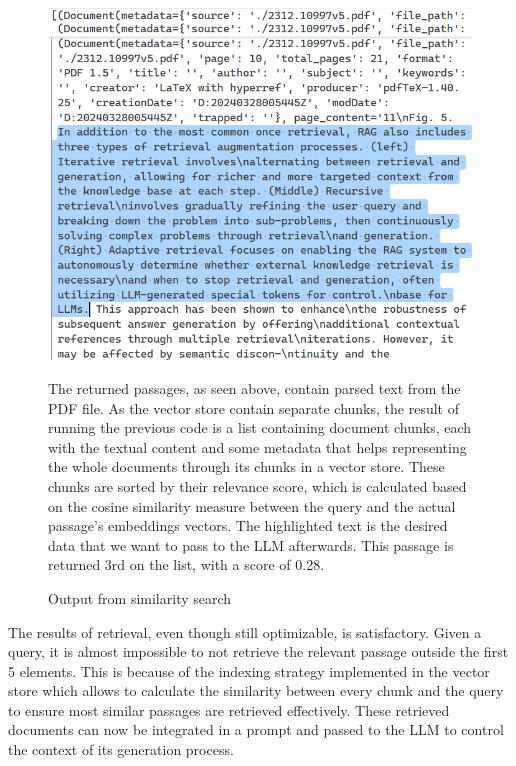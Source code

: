 \begin{figure}[H]
    \centering
    \includegraphics[width=\linewidth]{./figures/vectorstoresimilaritysearchwithscore_output.png}
    \caption{Output from similarity search}
    \begin{flushleft}
        \small The returned passages, as seen above, contain parsed text from the PDF file. As the vector store contain separate chunks, the result of running the previous code is a list containing document chunks, each with the textual content and some metadata that helps representing the whole documents through its chunks in a vector store. These chunks are sorted by their relevance score, which is calculated based on the cosine similarity measure between the query and the actual passage's embeddings vectors. The highlighted text is the desired data that we want to pass to the LLM afterwards. This passage is returned 3rd on the list, with a score of 0.28.
    \end{flushleft}
\end{figure}
The results of retrieval, even though still optimizable, is satisfactory. Given a query, it is almost impossible to not retrieve the relevant passage outside the first 5 elements. This is because of the indexing strategy implemented in the vector store which allows to calculate the similarity between every chunk and the query to ensure most similar passages are retrieved effectively.\newline
These retrieved documents can now be integrated in a prompt and passed to the LLM to control the context of its generation process.
